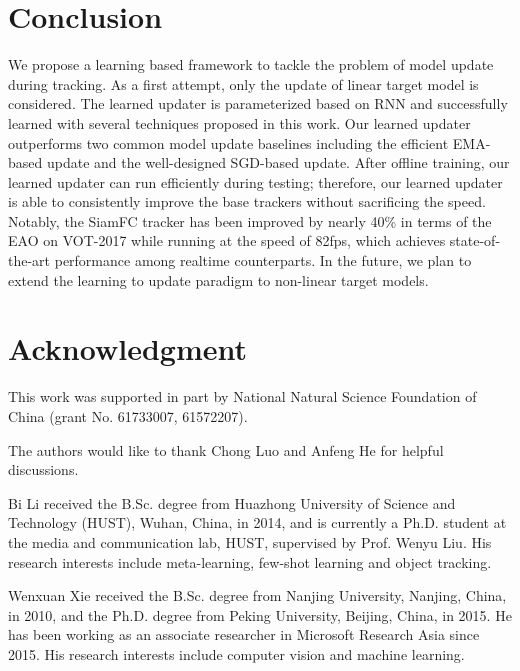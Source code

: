 \documentclass[journal]{IEEEtran}
\begin{document}
\section{Conclusion}
We propose a learning based framework to tackle the problem of model update during tracking. As a first attempt, only the update of linear target model is considered. The learned updater is parameterized based on RNN and successfully learned with several techniques proposed in this work. Our learned updater outperforms two common model update baselines including the efficient EMA-based update and the well-designed SGD-based update. After offline training, our learned updater can run efficiently during testing; therefore, our learned updater is able to consistently improve the base trackers without sacrificing the speed. Notably, the SiamFC tracker has been improved by nearly 40\% in terms of the EAO on VOT-2017 while running at the speed of 82fps, which achieves state-of-the-art performance among realtime counterparts. In the future, we plan to extend the learning to update paradigm to non-linear target models.


\appendices



\section*{Acknowledgment}
This work was supported in part by National Natural Science Foundation of China (grant No. 61733007, 61572207). 

The authors would like to thank Chong Luo and Anfeng He for helpful discussions.



\ifCLASSOPTIONcaptionsoff
  \newpage
\fi






\begin{IEEEbiography}{Bi Li}
received the B.Sc. degree from Huazhong University of Science and Technology (HUST), Wuhan, China, in 2014, and is currently a Ph.D. student at the media and communication lab, HUST, supervised by Prof. Wenyu Liu. His research interests include meta-learning, few-shot learning and object tracking.
\end{IEEEbiography}

\begin{IEEEbiography}{Wenxuan Xie}
	received the B.Sc. degree from Nanjing University, Nanjing, China, in 2010, and the Ph.D. degree from Peking University, Beijing, China, in 2015. He has been working as an associate researcher in Microsoft Research Asia since 2015. His research interests include computer vision and machine learning.
\end{IEEEbiography}
\end{document}
